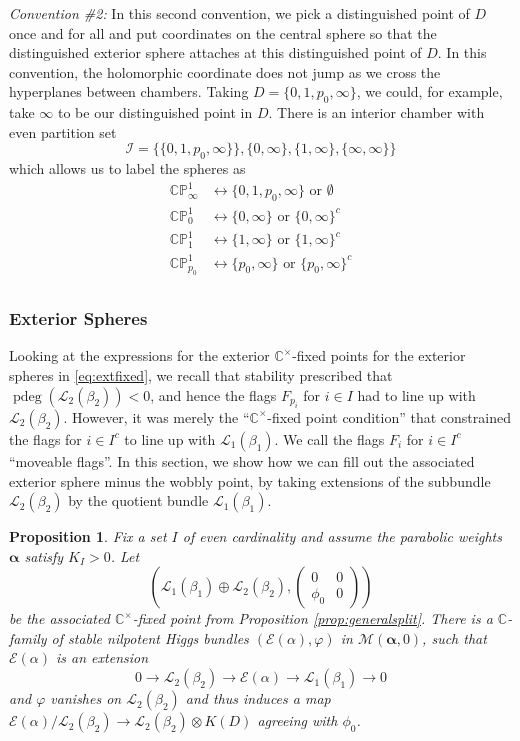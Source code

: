 \documentclass[12pt,letterpaper,reqno]{amsart}
\def\mathbf#1{#1}%
\newtheorem{prop}[thm]{Proposition}
\theoremstyle{remark}
\theoremstyle{definition}
\numberwithin{thm}{section}
\numberwithin{equation}{section}
\numberwithin{figure}{section}
\newcommand{\cL}{\ensuremath{\mathcal L}}
\newcommand{\cI}{\ensuremath{\mathcal I}}
\newcommand{\C}{\ensuremath{\mathbb C}}
\newcommand{\CP}{\ensuremath{\mathbb {CP}}}
\DeclareMathOperator{\pdeg}{pdeg}
\begin{document}
\smallskip

\noindent\emph{Convention \#2:} In this second convention, we pick a distinguished point of $D$ once and for all and put coordinates on the central sphere so that the distinguished exterior sphere attaches at this distinguished point of $D$.
In this convention, the holomorphic coordinate does not jump as we cross the hyperplanes between chambers.  
Taking $D=\{0, 1, p_0, \infty\}$,
we could, for example, take $\infty$ to be our distinguished point in $D$.  There is an interior chamber with even partition set
$$\cI=\{\{0, 1, p_0, \infty\}\}, \{0, \infty\}, \{1, \infty\}, \{\infty, \infty\} \}$$
which allows us to label the spheres as 
\begin{align*}
\CP^1_\infty &\leftrightarrow \{0, 1, p_0, \infty\} \mbox{ or } \emptyset\\
\CP^1_0 &\leftrightarrow \{0, \infty\} \mbox{ or } \{0, \infty\}^c \\
\CP^1_1 &\leftrightarrow \{1, \infty\} \mbox{ or } \{1, \infty\}^c\\
\CP^1_{p_0} &\leftrightarrow \{p_0, \infty\} \mbox{ or } \{p_0, \infty\}^c\\
\end{align*}


  


\subsubsection{Exterior Spheres} Looking at the expressions for the exterior $\C^\times$-fixed points for the exterior spheres in \eqref{eq:extfixed}, we recall that stability prescribed that $\pdeg (\cL_2(\beta_2))<0$, and hence the flags $F_{p_i}$ for $i \in I$ had to line up with $\cL_2(\beta_2)$. However, it was merely the ``$\C^\times$-fixed point condition'' that constrained the flags for $i \in I^c$ to line up with $\cL_1(\beta_1)$. We call the flags $F_i$ for $i \in I^c$ ``moveable flags''. In this section, we show how we can fill out the associated exterior sphere minus the wobbly point, by taking extensions of the subbundle $\cL_2(\beta_2)$ by the quotient bundle $\cL_1(\beta_1)$. 

\begin{prop} \label{prop:extension}
Fix a set $I$ of even cardinality and assume the parabolic weights $\boldsymbol{\alpha}$ satisfy $K_I>0$.  Let 
\[ \left(\cL_1(\beta_1)\oplus\cL_2(\beta_2),\begin{pmatrix}
        0&0\\\phi_0&0
\end{pmatrix}\right) \]
be the associated $\C^\times$-fixed point from Proposition \ref{prop:generalsplit}.
There is a $\C$-family of stable nilpotent Higgs bundles $(\mathcal{E}(\alpha), \varphi)$ in $\mathcal{M}(\boldsymbol{\alpha}, \mathbf{0})$, such that $\mathcal{E}(\alpha)$ is an extension
\[ 0 \to \cL_2(\beta_2) \to \mathcal{E}(\alpha) \to \cL_1(\beta_1) \to 0\]
and $\varphi$ vanishes on $\cL_2(\beta_2)$ and  thus induces a map $\mathcal{E}(\alpha)/\cL_2(\beta_2) \to \cL_2(\beta_2) \otimes K(D)$ agreeing with $\phi_0$.
\end{prop}
\end{document}
